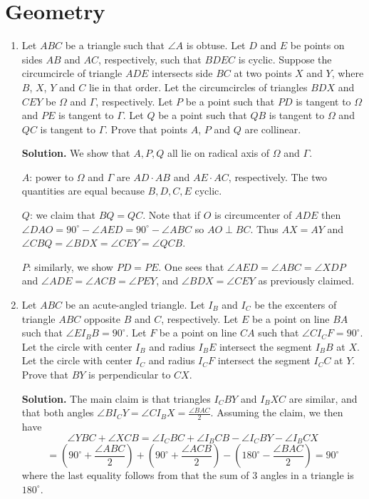 \documentclass[11pt,a4paper]{article}
\begin{document}
    \section*{Geometry}
    \begin{enumerate}
    	\item [G1.]
    	Let $ABC$ be a triangle such that $\angle A$ is obtuse. Let $D$ and $E$ be points on sides $AB$ and $AC$, respectively, such that $BDEC$ is cyclic. Suppose the circumcircle of triangle $ADE$ intersects side $BC$ at two points $X$ and $Y$, where $B$, $X$, $Y$ and $C$ lie in that order. Let the circumcircles of triangles $BDX$ and $CEY$ be $\Omega$ and $\Gamma$, respectively. Let $P$ be a point such that $PD$ is tangent to $\Omega$ and $PE$ is tangent to $\Gamma$. Let $Q$ be a point such that $QB$ is tangent to $\Omega$ and $QC$ is tangent to $\Gamma$. Prove that points $A$, $P$ and $Q$ are collinear.
    	
    	\textbf{Solution.} We show that $A, P, Q$ all lie on radical axis of $\Omega$ and $\Gamma$. 
    	
    	$A$: power to $\Omega$ and $\Gamma$ are $AD\cdot AB$ and $AE\cdot AC$, respectively. 
    	The two quantities are equal because $B, D, C, E$ cyclic. 
    	
    	$Q$: we claim that $BQ=QC$. Note that if $O$ is circumcenter of $ADE$ 
    	then $\angle DAO = 90^{\circ} - \angle AED = 90^{\circ} - \angle ABC$ so $AO\perp BC$. 
    	Thus $AX=AY$ and 
    	$\angle CBQ = \angle BDX=\angle CEY=\angle QCB$. 
    	
    	$P$: similarly, we show $PD=PE$. 
    	One sees that $\angle AED=\angle ABC=\angle XDP$ and $\angle ADE=\angle ACB=\angle PEY$, 
    	and $\angle BDX=\angle CEY$ as previously claimed. 
    	
    	\item[G2.] Let $ABC$ be an acute-angled triangle. Let $I_B$ and $I_C$ be the excenters of triangle $ABC$ opposite $B$ and $C$, respectively. Let $E$ be a point on line $BA$ such that $\angle EI_BB=90^\circ$. Let $F$ be a point on line $CA$ such that $\angle CI_CF=90^\circ$. Let the circle with center $I_B$ and radius $I_BE$ intersect the segment $I_BB$ at $X$. Let the circle with center $I_C$ and radius $I_CF$ intersect the segment $I_CC$ at $Y$. Prove that $BY$ is perpendicular to $CX$.
    	
    	\textbf{Solution.} 
    	The main claim is that triangles $I_CBY$ and $I_BXC$ are similar, 
    	and that both angles $\angle BI_CY=\angle CI_BX=\frac{\angle BAC}{2}$. 
    	Assuming the claim, 
    	we then have 
    	\[
    	\angle YBC +\angle XCB
    	=\angle I_CBC+\angle I_BCB-\angle I_CBY-\angle I_BCX
    	\]\[
    	= (90^{\circ}+\frac{\angle ABC}{2}) + (90^{\circ}+\frac{\angle ACB}{2}) - (180^{\circ}-\frac{\angle BAC}{2})
    	=90^{\circ}
    	\]
    	where the last equality follows from that the sum of 3 angles in a triangle is $180^{\circ}$. 
    	

\end{enumerate}
\end{document}
